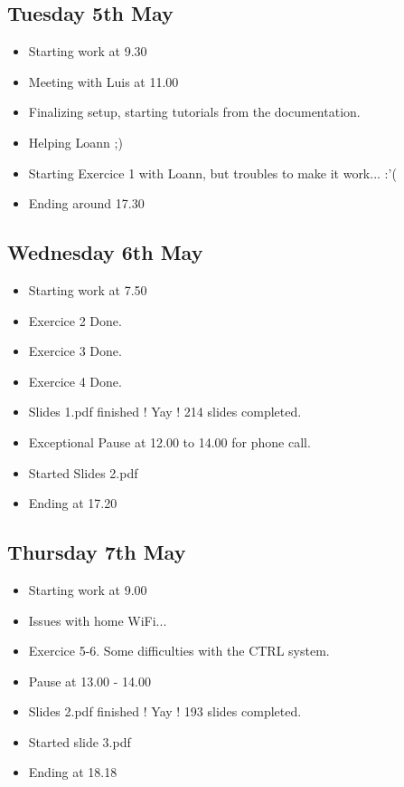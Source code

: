 \documentclass[a4paper, 10pt]{article}
\begin{document}
\subsection*{Tuesday 5th May}
\begin{itemize}
    \item Starting work at 9.30
    \item Meeting with Luis at 11.00 
    \item Finalizing setup, starting tutorials from the documentation.
    \item Helping Loann ;)
    \item Starting Exercice 1 with Loann, but troubles to make it work... :'(
    \item Ending around 17.30
\end{itemize}

\subsection*{Wednesday 6th May}
\begin{itemize}
    \item Starting work at 7.50
    \item Exercice 2 Done.
    \item Exercice 3 Done.
    \item Exercice 4 Done.
    \item Slides 1.pdf finished ! Yay ! 214 slides completed.
    \item Exceptional Pause at 12.00 to 14.00 for phone call.
    \item Started Slides 2.pdf
    \item Ending at 17.20
\end{itemize}

\subsection*{Thursday 7th May}
\begin{itemize}
    \item Starting work at 9.00
    \item Issues with home WiFi...
    \item Exercice 5-6. Some difficulties with the CTRL system.
    \item Pause at 13.00 - 14.00
    \item Slides 2.pdf finished ! Yay ! 193 slides completed.
    \item Started slide 3.pdf
    \item Ending at 18.18
\end{itemize}
\end{document}
